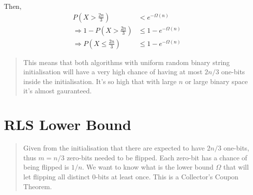 \documentclass[a4paper, 12pt]{article}
\begin{document}
        Then,
        \begin{align*}
            P\left(X > \frac{2n}{3}\right) &< e^{-\Omega(n)}\\
            \Rightarrow 1 - P\left(X > \frac{2n}{3}\right) &\leq 1 - e^{-\Omega(n)}\\
            \Rightarrow P\left(X \leq \frac{2n}{3}\right) &\leq 1 - e^{-\Omega(n)}
        \end{align*}
        \begin{quote}
            This means that both algorithms with uniform random binary string initialisation will have a very high chance of having at most $2n/3$ one-bits
            inside the initialisation. It's so high that with large $n$ or large binary space it's almost gauranteed.
        \end{quote}
\section{RLS Lower Bound}
        \begin{quote}
            Given from the initialisation that there are expected to have $2n/3$ one-bits, thus $m = n/3$ zero-bits needed to be flipped. Each zero-bit has a chance
            of being flipped is $1/n$. We want to know what is the lower bound $\Omega$ that will let flipping all distinct 0-bits at least once. This is a 
            Collector's Coupon Theorem.
        \end{quote}
\end{document}
